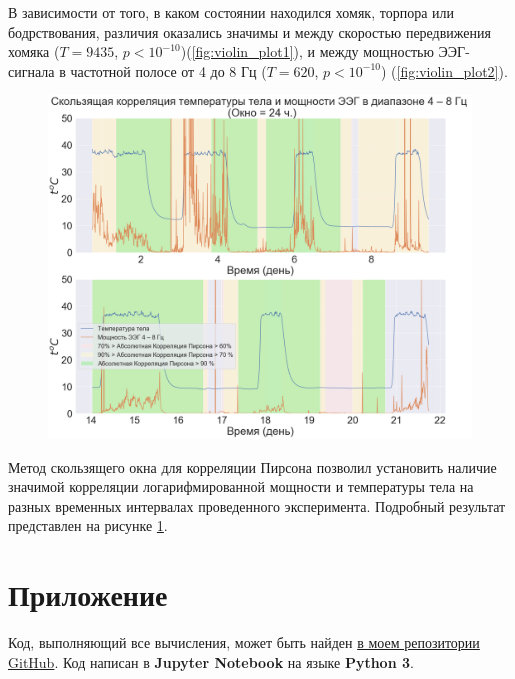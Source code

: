\documentclass[12pt,a4paper,oneside]{article}
\begin{document}
В зависимости от того, в каком состоянии находился хомяк, торпора или бодрствования, различия оказались значимы и между скоростью передвижения хомяка ($T = 9435$, $p < 10^{-10}$)(\ref{fig:violin_plot1}), и между мощностью ЭЭГ-сигнала в частотной полосе от 4 до 8 Гц ($T = 620$, $p < 10^{-10}$) (\ref{fig:violin_plot2}). 

\begin{figure}[H]
\centering
\includegraphics[width=0.7\linewidth]{moving_correlation.png}
\caption{}\label{fig:moving_correlation}
\end{figure}

Метод скользящего окна для корреляции Пирсона позволил установить наличие значимой корреляции логарифмированной мощности и температуры тела на разных временных интервалах проведенного эксперимента. Подробный результат представлен на рисунке \ref{fig:moving_correlation}.

\section{Приложение}

Код, выполняющий все вычисления, может быть найден \href{https://github.com/BasilMinkov/Jupyter-Notebooks/blob/master/HamsterEEG.ipynb}{в моем репозитории GitHub}. Код написан в \textbf{Jupyter Notebook} на языке \textbf{Python 3}.




\end{document}
